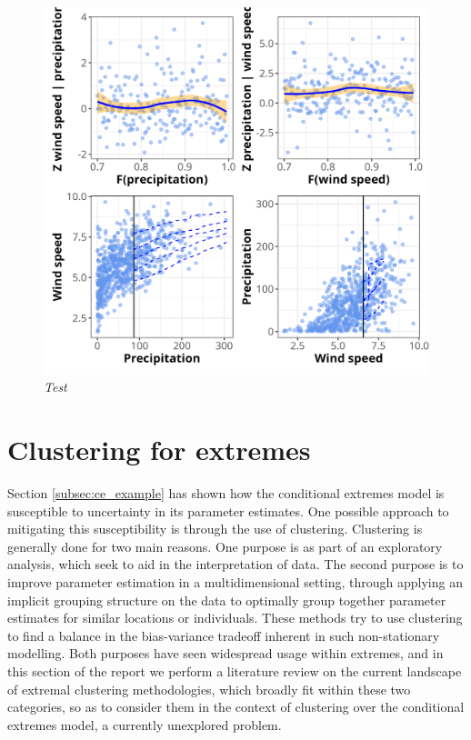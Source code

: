 \documentclass{article}
\numberwithin{equation}{section}
\begin{document}
\begin{figure}[H]
    \centering
    \includegraphics[width = 0.9\linewidth]{plots/048_diag.png}
    \caption{\emph{Test}}
    \label{fig:04_diag}
\end{figure}


\newpage
\section{Clustering for extremes}\label{sec:clustering}


Section \ref{subsec:ce_example} has shown how the conditional extremes model is susceptible to uncertainty in its parameter estimates. 
One possible approach to mitigating this susceptibility is through the use of clustering. 
Clustering is generally done for two main reasons.
One purpose is as part of an exploratory analysis, which seek to aid in the interpretation of data. 
The second purpose is to improve parameter estimation in a multidimensional setting, through applying an implicit grouping structure on the data to optimally group together parameter estimates for similar locations or individuals. 
These methods try to use clustering to find a balance in the bias-variance tradeoff inherent in such non-stationary modelling. 
Both purposes have seen widespread usage within extremes, and in this section of the report we perform a literature review on the current landscape of extremal clustering methodologies, which broadly fit within these two categories, so as to consider them in the context of clustering over the conditional extremes model, a currently unexplored problem.
\end{document}
